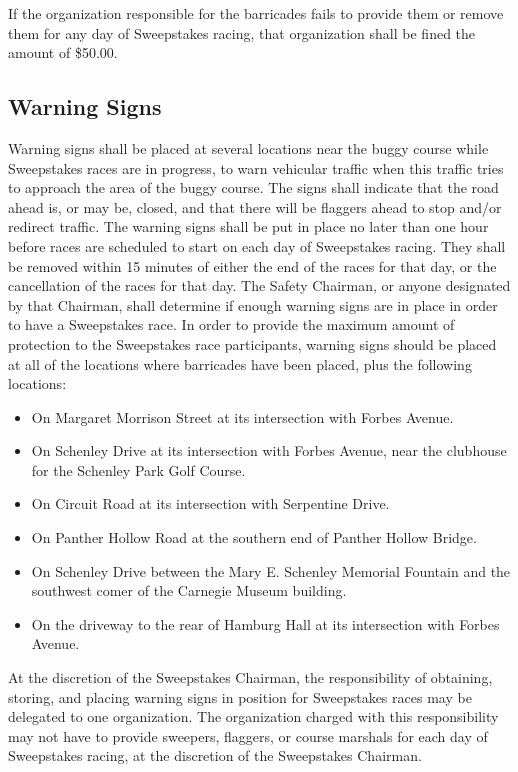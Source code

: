 If the organization responsible for the barricades fails to provide them or remove them for any day of Sweepstakes racing, that organization shall be fined the amount of \$50.00.

\subsection{Warning Signs}

Warning signs shall be placed at several locations near the buggy course while Sweepstakes races are in progress, to warn vehicular traffic when this traffic tries to approach the area of the buggy course. The signs shall indicate that the road ahead is, or may be, closed, and that there will be flaggers ahead to stop and/or redirect traffic. The warning signs shall be put in place no later than one hour before races are scheduled to start on each day of Sweepstakes racing. They shall be removed within 15 minutes of either the end of the races for that day, or the cancellation of the races for that day. The Safety Chairman, or anyone designated by that Chairman, shall determine if enough warning signs are in place in order to have a Sweepstakes race. In order to provide the maximum amount of protection to the Sweepstakes race participants, warning signs should be placed at all of the locations where barricades have been placed, plus the following locations:
\begin{itemize}
	\item On Margaret Morrison Street at its intersection with Forbes Avenue.
	\item On Schenley Drive at its intersection with Forbes Avenue, near the clubhouse for the Schenley Park Golf Course.
	\item On Circuit Road at its intersection with Serpentine Drive.
	\item On Panther Hollow Road at the southern end of Panther Hollow Bridge.
	\item On Schenley Drive between the Mary E. Schenley Memorial Fountain and the southwest comer of the Carnegie Museum building.
	\item On the driveway to the rear of Hamburg Hall at its intersection with Forbes Avenue.
\end{itemize}

At the discretion of the Sweepstakes Chairman, the responsibility of obtaining, storing, and placing warning signs in position for Sweepstakes races may be delegated to one organization. The organization charged with this responsibility may not have to provide sweepers, flaggers, or course marshals for each day of Sweepstakes racing, at the discretion of the Sweepstakes Chairman.

